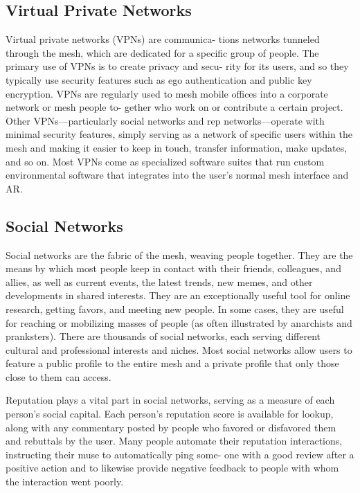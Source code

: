 \subsection{Virtual Private Networks}

Virtual private networks (VPNs) are communica-
tions networks tunneled through the mesh, which 
are dedicated for a specific group of people. The 
primary use of VPNs is to create privacy and secu-
rity for its users, and so they typically use security 
features such as ego authentication and public key 
encryption. VPNs are regularly used to mesh mobile 
offices into a corporate network or mesh people to-
gether who work on or contribute a certain project. 
Other VPNs—particularly social networks and rep 
networks—operate with minimal security features, 
simply serving as a network of specific users within 
the mesh and making it easier to keep in touch, 
transfer information, make updates, and so on. Most 
VPNs come as specialized software suites that run 
custom environmental software that integrates into 
the user's normal mesh interface and AR.

\subsection{Social Networks}

Social networks are the fabric of the mesh, weaving 
people together. They are the means by which most 
people keep in contact with their friends, colleagues, 
and allies, as well as current events, the latest trends, 
new memes, and other developments in shared 
interests. They are an exceptionally useful tool for 
online research, getting favors, and meeting new 
people. In some cases, they are useful for reaching 
or mobilizing masses of people (as often illustrated 
by anarchists and pranksters). There are thousands 
of social networks, each serving different cultural 
and professional interests and niches. Most social 
networks allow users to feature a public profile to 
the entire mesh and a private profile that only those 
close to them can access.

Reputation plays a vital part in social networks, 
serving as a measure of each person's social capital. 
Each person's reputation score is available for lookup, 
along with any commentary posted by people who 
favored or disfavored them and rebuttals by the user. 
Many people automate their reputation interactions, 
instructing their muse to automatically ping some-
one with a good review after a positive action and 
to likewise provide negative feedback to people with 
whom the interaction went poorly.

